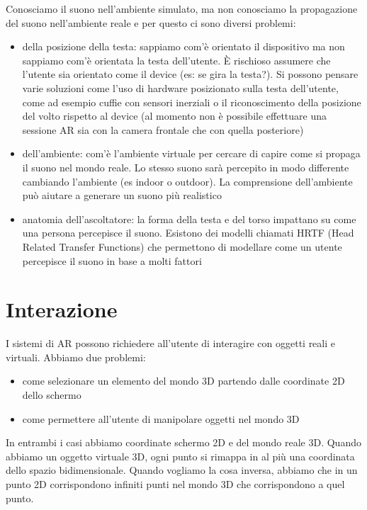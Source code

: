 Conosciamo il suono nell'ambiente simulato, ma non conosciamo la propagazione del suono nell'ambiente reale e per questo ci sono diversi problemi: 
\begin{itemize}
    \item della posizione della testa: sappiamo com'è orientato il dispositivo ma non sappiamo com'è orientata la testa dell'utente. È rischioso assumere che l'utente sia orientato come il device (es: se gira la testa?). Si possono pensare varie soluzioni come l'uso di hardware posizionato sulla testa dell'utente, come ad esempio cuffie con sensori inerziali o il riconoscimento della posizione del volto rispetto al device (al momento non è possibile effettuare una sessione AR sia con la camera frontale che con quella posteriore)
    \item dell'ambiente: com'è l'ambiente virtuale per cercare di capire come si propaga il suono nel mondo reale. Lo stesso suono sarà percepito in modo differente cambiando l'ambiente (es indoor o outdoor). La comprensione dell'ambiente può aiutare a generare un suono più realistico
    \item anatomia dell'ascoltatore: la forma della testa e del torso impattano su come una persona percepisce il suono. Esistono dei modelli chiamati HRTF (Head Related Transfer Functions) che permettono di modellare come un utente percepisce il suono in base a molti fattori
\end{itemize}

\section{Interazione}
I sistemi di AR possono richiedere all'utente di interagire con oggetti reali e virtuali. 
Abbiamo due problemi: 
\begin{itemize}
    \item come selezionare un elemento del mondo 3D partendo dalle coordinate 2D dello schermo
    \item come permettere all'utente di manipolare oggetti nel mondo 3D
\end{itemize}

In entrambi i casi abbiamo coordinate schermo 2D e del mondo reale 3D. 
Quando abbiamo un oggetto virtuale 3D, ogni punto si rimappa in al più una coordinata dello spazio bidimensionale. 
Quando vogliamo la cosa inversa, abbiamo che in un punto 2D corrispondono infiniti punti nel mondo 3D che corrispondono a quel punto. 

